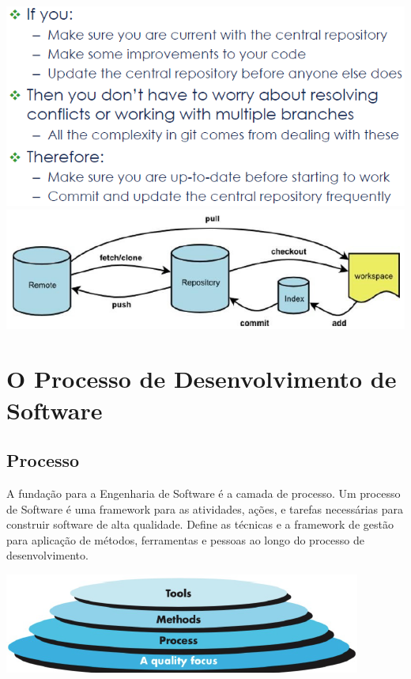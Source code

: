 \documentclass{article}
\begin{document}
\begin{center}
  \includegraphics[scale=0.6]{6}
  \includegraphics[scale=0.6]{7}
\end{center}

\pagebreak

\section{O Processo de Desenvolvimento de Software}

\subsection{Processo}

A fundação para a Engenharia de Software é a camada de processo.
Um processo de Software é uma framework para as atividades,
ações, e tarefas necessárias para construir software de alta qualidade.
Define as técnicas e a framework de gestão para aplicação de métodos,
ferramentas e pessoas ao longo do processo de desenvolvimento.

\begin{center}
  \includegraphics[scale=0.6]{8}
\end{center}
\end{document}
